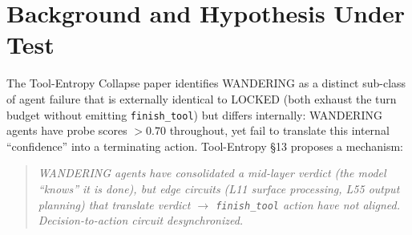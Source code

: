 \documentclass[11pt]{article}
\begin{document}
\begin{abstract}
\textbf{Methodological discovery (load-bearing)}: the Phase 6 WANDERING classification is not run-stable under temperature$=$1.0. Re-running the same instances no-hook on the same RTX 6000 Pro Blackwell flips 7/20 = 35\% to \texttt{finish\_tool} (a fresh determinism check yields 0/5) --- a temperature-sampling effect, not a hardware effect (no H100 used). This is not a footnote: it is exactly why every intervention test here must be \emph{paired} against a same-session no-hook baseline, and why an unpaired comparison against the 0/20 definitional baseline manufactures false positives.

\textbf{Synthesis}: three nulls on the rescue axis (patch-quality, L55 injection, L11 injection), not one positive. The mechanism hypothesis's actionable form --- ``inject the SUCCESS edge-direction to rescue WANDERING'' --- is false at both edge layers tested, including at L11, the layer an independent classification paper identifies as WANDERING's single best discriminator. The detector/lever gap does not close by correcting the locus: L11 is the right place to \emph{read} WANDERING and the wrong place to \emph{steer} it to completion. The one robust causal effect of edge-layer injection is destabilization, not finishing. The companion classification paper further shows \emph{which} agents flip is predicted by tool-entropy collapse depth, not by the residual signature --- the behavioral signal, not the residual direction, is what tracks outcome.
\end{abstract}

\section{Background and Hypothesis Under Test}

The Tool-Entropy Collapse paper \cite{tool_entropy_2026} identifies WANDERING as a distinct sub-class of agent failure that is externally identical to LOCKED (both exhaust the turn budget without emitting \texttt{finish\_tool}) but differs internally: WANDERING agents have probe scores $>0.70$ throughout, yet fail to translate this internal ``confidence'' into a terminating action. Tool-Entropy \S13 proposes a mechanism:

\begin{quote}
\textit{WANDERING agents have consolidated a mid-layer verdict (the model ``knows'' it is done), but edge circuits (L11 surface processing, L55 output planning) that translate verdict $\rightarrow$ \texttt{finish\_tool} action have not aligned. Decision-to-action circuit desynchronized.}
\end{quote}
\end{document}
